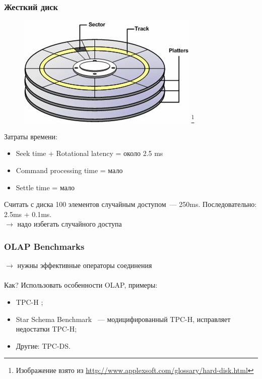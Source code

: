 \documentclass{beamer}
\begin{document}
\begin{frame}
\frametitle{Жесткий диск}

\begin{figure}[htb]
\includegraphics[width=\textwidth,height=0.320\textheight,keepaspectratio]{harddisk.png} 
\footnote{\tiny{Изображение взято из \url{http://www.applexsoft.com/glossary/hard-disk.html}}}
\end{figure}    
Затраты времени:
\begin{itemize}
  \item Seek time + Rotational latency = около 2.5 ms
  \item Command processing time = мало
  \item Settle time = мало
\end{itemize}
Считать с диска 100 элементов случайным доступом~--- 250ms. Последовательно: 2.5ms + 0.1ms.\\
$\longrightarrow$ надо избегать случайного доступа

\end{frame}

\begin{frame}
\frametitle{OLAP Benchmarks}

$\longrightarrow$ нужны эффективные операторы соединения\\~\\

Как? Использовать особенности OLAP, примеры:

\begin{itemize}
  \setlength\itemsep{1em}
  \item TPC-H \cite{TPC-H};
  \item Star Schema Benchmark \cite{SSB}~--- модицифированный TPC-H, исправляет недостатки TPC-H;
  \item Другие: TPC-DS.
\end{itemize}

\end{frame}
\end{document}
